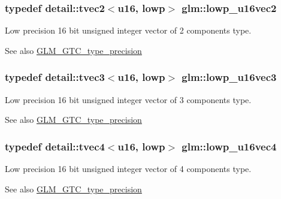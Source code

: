 \subsubsection[{\texorpdfstring{lowp\+\_\+u16vec2}{lowp_u16vec2}}]{\setlength{\rightskip}{0pt plus 5cm}typedef detail\+::tvec2$<$u16, lowp$>$ {\bf glm\+::lowp\+\_\+u16vec2}}\hypertarget{group__gtc__type__precision_gaff5ca5a8bc621bb8f4b28f046c0de508}{}\label{group__gtc__type__precision_gaff5ca5a8bc621bb8f4b28f046c0de508}
Low precision 16 bit unsigned integer vector of 2 components type. \begin{DoxySeeAlso}{See also}
\hyperlink{group__gtc__type__precision}{G\+L\+M\+\_\+\+G\+T\+C\+\_\+type\+\_\+precision} 
\end{DoxySeeAlso}
\subsubsection[{\texorpdfstring{lowp\+\_\+u16vec3}{lowp_u16vec3}}]{\setlength{\rightskip}{0pt plus 5cm}typedef detail\+::tvec3$<$u16, lowp$>$ {\bf glm\+::lowp\+\_\+u16vec3}}\hypertarget{group__gtc__type__precision_ga74d5491c9ee66d068309d200601e907b}{}\label{group__gtc__type__precision_ga74d5491c9ee66d068309d200601e907b}
Low precision 16 bit unsigned integer vector of 3 components type. \begin{DoxySeeAlso}{See also}
\hyperlink{group__gtc__type__precision}{G\+L\+M\+\_\+\+G\+T\+C\+\_\+type\+\_\+precision} 
\end{DoxySeeAlso}
\subsubsection[{\texorpdfstring{lowp\+\_\+u16vec4}{lowp_u16vec4}}]{\setlength{\rightskip}{0pt plus 5cm}typedef detail\+::tvec4$<$u16, lowp$>$ {\bf glm\+::lowp\+\_\+u16vec4}}\hypertarget{group__gtc__type__precision_gab0210f390e7d75fa8eb42128a05ff23a}{}\label{group__gtc__type__precision_gab0210f390e7d75fa8eb42128a05ff23a}
Low precision 16 bit unsigned integer vector of 4 components type. \begin{DoxySeeAlso}{See also}
\hyperlink{group__gtc__type__precision}{G\+L\+M\+\_\+\+G\+T\+C\+\_\+type\+\_\+precision} 
\end{DoxySeeAlso}
